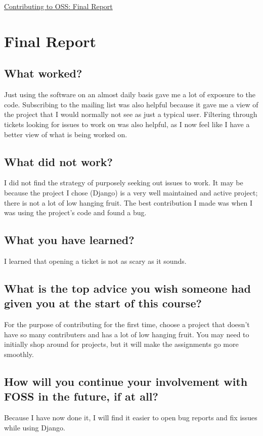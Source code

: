 \documentclass[12pt]{article}
\def\title{Contributing to OSS: Final Report}
\begin{document}
\begin{center}
\underline{
\large{\title}
}
\end{center}
\singlespacing

\section{Final Report}
\subsection{What worked?}
Just using the software on an almost daily basis gave me a lot of exposure to
the code. Subscribing to the mailing list was also helpful because it gave me a
view of the project that I would normally not see as just a typical user.
Filtering through tickets looking for issues to work on was also helpful, as I
now feel like I have a better view of what is being worked on.
\subsection{What did not work?}
I did not find the strategy of purposely seeking out issues to work. It may be
because the project I chose (Django) is a very well maintained and active
project; there is not a lot of low hanging fruit. The best contribution I made
was when I was using the project's code and found a bug.
\subsection{What you have learned?}
I learned that opening a ticket is not as scary as it sounds.
\subsection{What is the top advice you wish someone had given you at the start of this course?}
For the purpose of contributing for the first time, choose a project that
doesn't have so many contributers and has a lot of low hanging fruit. You may
need to initially shop around for projects, but it will make the assignments
go more smoothly.
\subsection{How will you continue your involvement with FOSS in the future, if at all?}
Because I have now done it, I will find it easier to open bug reports and
fix issues while using Django.
\end{document}
